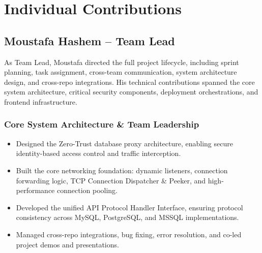 \section{Individual Contributions}

\subsection{Moustafa Hashem -- Team Lead}

As Team Lead, Moustafa directed the full project lifecycle, including sprint planning, task assignment, cross-team communication, system architecture design, and cross-repo integrations. His technical contributions spanned the core system architecture, critical security components, deployment orchestrations, and frontend infrastructure.

\subsubsection{Core System Architecture \& Team Leadership}
\begin{itemize}
    \item Designed the Zero-Trust database proxy architecture, enabling secure identity-based access control and traffic interception.
    \item Built the core networking foundation: dynamic listeners, connection forwarding logic, TCP Connection Dispatcher \& Peeker, and high-performance connection pooling.
    \item Developed the unified API Protocol Handler Interface, ensuring protocol consistency across MySQL, PostgreSQL, and MSSQL implementations.
    \item Managed cross-repo integrations, bug fixing, error resolution, and co-led project demos and presentations.
\end{itemize}

